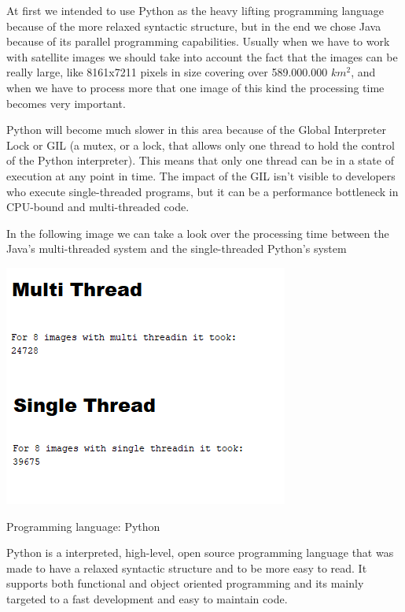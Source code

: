 \documentclass[12pt, a4paper]{report}
\begin{document}
At first we intended to use Python as the heavy lifting programming language because of the more relaxed syntactic structure, but in the end we chose Java because of its parallel programming capabilities. Usually when we have to work with satellite images we should take into account the fact that the images can be really large, like 8161x7211 pixels in size covering over 589.000.000 $km^2$, and when we have to process more that one image of this kind the processing time becomes very important.
\par

Python will become much slower in this area because of the Global Interpreter Lock or GIL (a mutex, or a lock, that allows only one thread to hold the control of the Python interpreter). This means that only one thread can be in a state of execution at any point in time. The impact of the GIL isn’t visible to developers who execute single-threaded programs, but it can be a performance bottleneck in CPU-bound and multi-threaded code.
\par
\bigskip

In the following image we can take a look over the processing time between the Java's multi-threaded system and the single-threaded Python's system
\par

\includegraphics[scale=0.6]{multi_thread.png}
\par

{\Large Programming language: Python\par}
\medskip

Python is a interpreted, high-level, open source programming language that was made to have a  relaxed syntactic structure and to be more easy to read. It supports both functional and object oriented programming and its mainly targeted to a fast development and easy to maintain code.
\par
\end{document}
